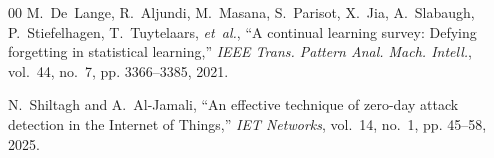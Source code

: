 \documentclass[conference]{IEEEtran}
\begin{document}
\begin{thebibliography}{00}
M.~De~Lange, R.~Aljundi, M.~Masana, S.~Parisot, X.~Jia, A.~Slabaugh, P.~Stiefelhagen, T.~Tuytelaars, \emph{et~al.}, ``A continual learning survey: Defying forgetting in statistical learning,'' \emph{IEEE Trans. Pattern Anal. Mach. Intell.}, vol.~44, no.~7, pp. 3366--3385, 2021.

N.~Shiltagh and A.~Al-Jamali, ``An effective technique of zero-day attack detection in the Internet of Things,'' \emph{IET Networks}, vol.~14, no.~1, pp. 45--58, 2025.

\end{thebibliography}
\end{document}
